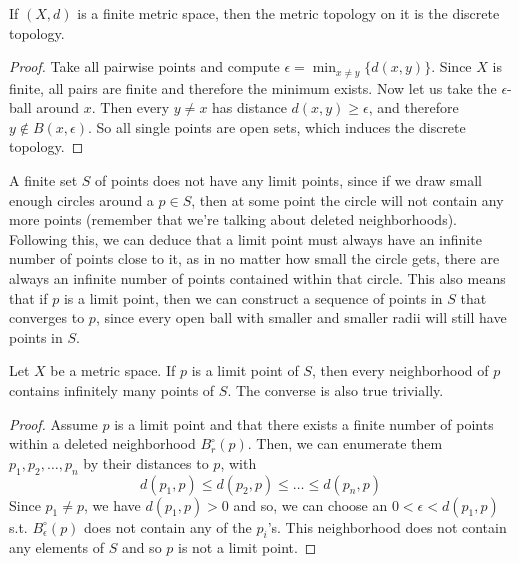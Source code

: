   \begin{theorem}
    If $(X, d)$ is a finite metric space, then the metric topology on it is the discrete topology. 
  \end{theorem}
  \begin{proof}
    Take all pairwise points and compute $\epsilon = \min_{x \neq y} \{d(x, y)\}$. Since $X$ is finite, all pairs are finite and therefore the minimum exists. Now let us take the $\epsilon$-ball around $x$. Then every $y \neq x$ has distance $d(x, y) \geq \epsilon$, and therefore $y \not\in B(x, \epsilon)$. So all single points are open sets, which induces the discrete topology. 
  \end{proof}

  A finite set $S$ of points does not have any limit points, since if we draw small enough circles around a $p \in S$, then at some point the circle will not contain any more points (remember that we're talking about deleted neighborhoods). Following this, we can deduce that a limit point must always have an infinite number of points close to it, as in no matter how small the circle gets, there are always an infinite number of points contained within that circle. This also means that if $p$ is a limit point, then we can construct a sequence of points in $S$ that converges to $p$, since every open ball with smaller and smaller radii will still have points in $S$.

  \begin{theorem}
    Let $X$ be a metric space. If $p$ is a limit point of $S$, then every neighborhood of $p$ contains infinitely many points of $S$. The converse is also true trivially. 
  \end{theorem}
  \begin{proof}
    Assume $p$ is a limit point and that there exists a finite number of points within a deleted neighborhood $B_r^\circ (p)$. Then, we can enumerate them $p_1, p_2, \ldots, p_n$ by their distances to $p$, with 
    \begin{equation}
      d(p_1, p) \leq d(p_2, p) \leq \ldots \leq d(p_n, p)
    \end{equation}
    Since $p_1 \neq p$, we have $d(p_1, p) > 0$ and so, we can choose an $0 < \epsilon < d(p_1, p)$ s.t. $B_\epsilon^\circ (p)$ does not contain any of the $p_i$'s. This neighborhood does not contain any elements of $S$ and so $p$ is not a limit point. 
  \end{proof}

